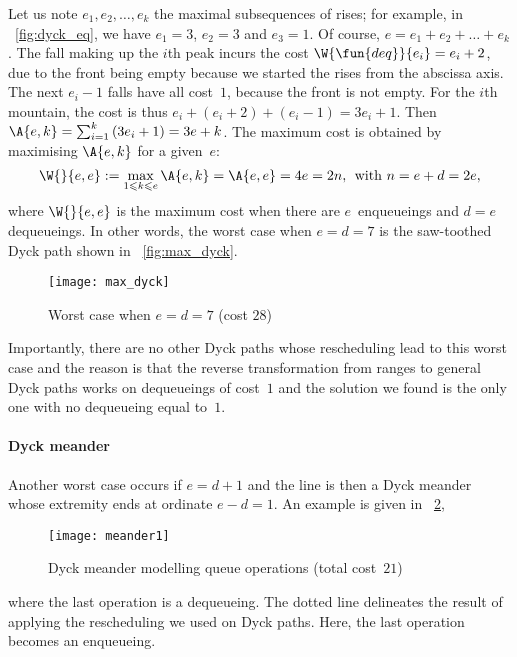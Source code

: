 Let us note \(e_1, e_2, \dots, e_k\) the maximal subsequences of
rises; for example, in \fig~\ref{fig:dyck_eq}, we have \(e_1=3\),
\(e_2 = 3\) and \(e_3 = 1\). Of course, \(e = e_1 + e_2 + \dots +
e_k\). The fall making up the \(i\)th peak incurs the
cost \(\W{\fun{deq}}{e_i} = e_i + 2\),
due to the front being empty because we started the rises from the
abscissa axis. The next \(e_i-1\) falls have all cost~\(1\), because
the front is not empty. For the \(i\)th mountain, the cost is thus
\(e_i+(e_i+2)+(e_i-1) = 3e_i+1\). Then \(\A{e,k} =
\sum_{i=1}^{k}{(3e_i+1)} = 3e + k\). The maximum cost is obtained by
maximising \(\A{e,k}\) for a given~\(e\):
\begin{equation*}
\W{}{e,e} := \max_{1 \leqslant k \leqslant e}{\A{e,k}} = \A{e,e} = 4e
= 2n,\,\; \text{with \(n=e+d=2e\)},
\end{equation*}
where \(\W{}{e,e}\) is the maximum cost when there are
\(e\)~enqueueings and \({d=e}\) dequeueings. In other words, the worst
case when \(e=d=7\) is the saw\hyp{}toothed Dyck path shown in
\fig~\vref{fig:max_dyck}.
\begin{figure}
\centering
\texttt{[image: max\_dyck]}
\caption{Worst case when \(e=d=7\) (cost \(28\))}
\label{fig:max_dyck}
\end{figure}
Importantly, there are no other Dyck paths whose rescheduling lead to
this worst case and the reason is that the reverse transformation from
ranges to general Dyck paths works on dequeueings of cost~\(1\) and
the solution we found is the only one with no dequeueing equal
to~\(1\).

\paragraph{Dyck meander}

Another worst case occurs if \(e = d + 1\) and the line is then a Dyck
meander whose extremity ends at ordinate \(e-d=1\). An example is
given in \fig~\ref{fig:meander1},
\begin{figure}[t]
\centering
\texttt{[image: meander1]}
\caption{Dyck meander modelling queue operations (total cost~\(21\))}
\label{fig:meander1}
\end{figure}
where the last operation is a dequeueing. The dotted line delineates
the result of applying the rescheduling we used on Dyck paths. Here,
the last operation becomes an enqueueing.

